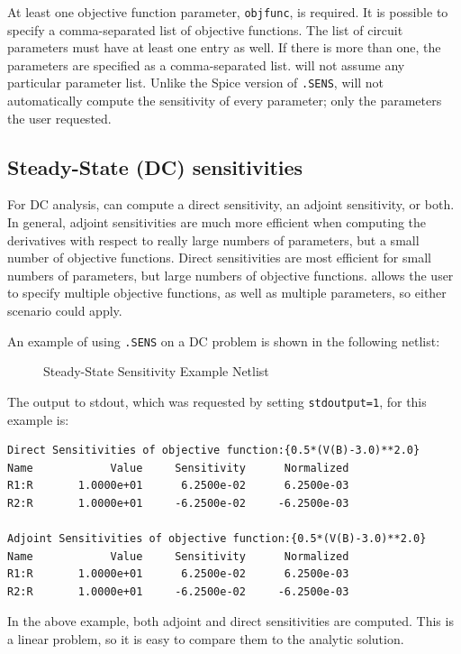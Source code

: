 At least one objective function parameter, \texttt{objfunc}, is required.  It is
possible to specify a comma-separated list of objective functions.  The list of circuit 
parameters must have at least one entry as well.  If there is more than one, the parameters
are specified as a comma-separated list.   \Xyce{} will not assume any particular
parameter list.  Unlike the Spice version of \texttt{.SENS}, \Xyce{} will not 
automatically compute the sensitivity of every parameter; only the parameters the
user requested.

\subsection{Steady-State (DC) sensitivities}

For DC analysis, \Xyce{} can compute a direct sensitivity, an adjoint sensitivity, or both.
In general, adjoint sensitivities are much more efficient when computing the derivatives
with respect to really large numbers of parameters, but a small number of objective
functions.  Direct sensitivities are most efficient for small numbers of parameters,
but large numbers of objective functions.  \Xyce{} allows the user to specify
multiple objective functions, as well as multiple parameters, so either scenario could apply.

An example of using \texttt{.SENS} on a DC problem is shown in the following netlist:
\begin{figure}[htbp]
  \begin{centering}
\caption[Steady-State Sensitivity Example Netlist]
{Steady-State Sensitivity Example Netlist \label{DC_Sensitivity_Netlist} }
\end{centering}
\end{figure}
The output to stdout, which was requested by setting \texttt{stdoutput=1}, for this example is:
\begin{verbatim}
Direct Sensitivities of objective function:{0.5*(V(B)-3.0)**2.0}
Name	        Value	  Sensitivity	   Normalized
R1:R	   1.0000e+01	   6.2500e-02	   6.2500e-03
R2:R	   1.0000e+01	  -6.2500e-02	  -6.2500e-03

Adjoint Sensitivities of objective function:{0.5*(V(B)-3.0)**2.0}
Name	        Value	  Sensitivity	   Normalized
R1:R	   1.0000e+01	   6.2500e-02	   6.2500e-03
R2:R	   1.0000e+01	  -6.2500e-02	  -6.2500e-03
\end{verbatim}
In the above example, both adjoint and direct sensitivities are computed.  This is 
a linear problem, so it is easy to compare them to the analytic solution.

